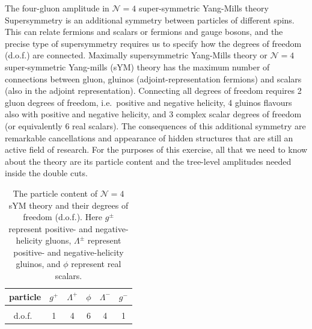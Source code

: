 \begin{exer}{The four-gluon amplitude in $\mathcal{N}=4$ super-symmetric Yang-Mills theory}
\label{Ex:3.1}
%
Supersymmetry is an additional symmetry between particles of different spins.
This can relate fermions and scalars or fermions and gauge bosons, and the
precise type of supersymmetry requires us to specify how the degrees of freedom (d.o.f.)
are connected. Maximally supersymmetric Yang-Mills theory or $\mathcal{N}=4$
super-symmetric Yang-mills (sYM) theory has the maximum number of connections between
gluon, gluinos (adjoint-representation fermions) and scalars (also in the
adjoint representation). Connecting all degrees of freedom requires 2 gluon
degrees of freedom, i.e.\ positive and negative helicity, 4 gluinos flavours
also with positive and negative helicity, and 3 complex scalar degrees of
freedom (or equivalently 6 real scalars). The consequences of this additional
symmetry are remarkable cancellations and appearance of hidden structures that
are still an active field of research. For the purposes of this exercise, all
that we need to know about the theory are its particle content and the
tree-level amplitudes needed inside the double cuts.

\begin{table}[t]
\centering
\begin{tabular}[h]{c|ccccc}
  particle &$g^+$ & $\Lambda^+$ & $\phi$ & $\Lambda^-$ & $g^-$ \\
  \hline \\
  d.o.f.\ & 1 & 4 & 6 & 4 & 1
\end{tabular}
\caption{The particle content of $\mathcal{N}=4$ sYM theory and their degrees of freedom (d.o.f.). Here
$g^\pm$ represent positive- and negative-helicity gluons, $\Lambda^\pm$
represent positive- and negative-helicity gluinos, and $\phi$ represent real scalars.}
\label{fig:nis4part}
\end{table}


\end{exer}
